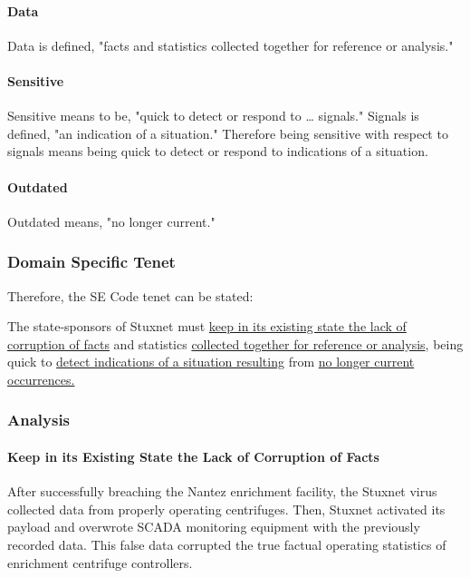 \documentclass[12pt]{article}
\begin{document}
\begin{multicols}{2}
\paragraph{Data}

Data is defined, "facts and statistics collected together for reference or analysis."\cite{dataDefinition}

\paragraph{Sensitive}

Sensitive means to be, "quick to detect or respond to … signals."\cite{oxfordDictionary} Signals is defined, "an indication of a situation."\cite{oxfordDictionary} Therefore being sensitive with respect to signals means being quick to detect or respond to indications of a situation.

\paragraph{Outdated}

Outdated means, "no longer current."\cite{merriamWebsterDefinitions}

\subsubsection{Domain Specific Tenet}

Therefore, the SE Code tenet can be stated:

\begin{framed}
The state-sponsors of Stuxnet must \ul{keep in its existing state the lack of corruption of facts} and statistics \ul{collected together for reference or analysis}, being quick to \ul{detect indications of a situation resulting} from \ul{no longer current occurrences.}
\end{framed}

\subsubsection{Analysis}

\paragraph{Keep in its Existing State the Lack of Corruption of Facts}

After successfully breaching the Nantez enrichment facility, the Stuxnet virus collected data from properly operating centrifuges. Then, Stuxnet activated its payload and overwrote SCADA monitoring equipment with the previously recorded data.\cite{lessonsFromStuxnet} This false data corrupted the true factual operating statistics of enrichment centrifuge controllers.


\end{multicols}
\end{document}
